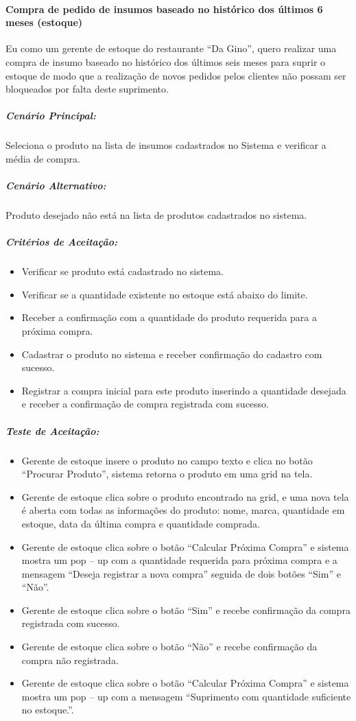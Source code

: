 \paragraph{Compra de pedido de insumos baseado no histórico dos últimos 6 meses (estoque)}

Eu como um gerente de estoque do restaurante “Da Gino”, quero realizar uma compra de insumo baseado no histórico dos últimos seis meses para suprir o estoque de modo que a realização de novos pedidos pelos clientes não possam ser bloqueados por falta deste suprimento.

\subparagraph{Cenário Principal:}

Seleciona o produto na lista de insumos cadastrados no Sistema e verificar a média de compra.

\subparagraph{Cenário Alternativo:}

Produto desejado não está na lista de produtos cadastrados no sistema.

\subparagraph{Critérios de Aceitação:}

\begin{itemize}
\item Verificar se produto está cadastrado no sistema.
\item Verificar se a quantidade existente no estoque está abaixo do limite.
\item Receber a confirmação com a quantidade do produto requerida para a próxima compra.
\item Cadastrar o produto no sistema e receber confirmação do cadastro com sucesso.
\item Registrar a compra inicial para este produto inserindo a quantidade desejada e receber a confirmação de compra registrada com sucesso.
\end{itemize}

\subparagraph{Teste de Aceitação:}

\begin{itemize}
\item Gerente de estoque insere o produto no campo texto e clica no botão “Procurar Produto”, sistema retorna o produto em uma grid na tela.
\item Gerente de estoque clica sobre o produto encontrado na grid, e uma nova tela é aberta com todas as informações do produto: nome, marca, quantidade em estoque, data da última compra e quantidade comprada.
\item Gerente de estoque clica sobre o botão “Calcular Próxima Compra” e sistema mostra um pop – up com a quantidade requerida para próxima compra e a mensagem “Deseja registrar a nova compra” seguida de dois botões “Sim” e “Não”.
\item Gerente de estoque clica sobre o botão “Sim” e recebe confirmação da compra registrada com sucesso.
\item Gerente de estoque clica sobre o botão “Não” e recebe confirmação da compra não registrada.
\item Gerente de estoque clica sobre o botão “Calcular Próxima Compra” e sistema mostra um pop – up com a mensagem “Suprimento com quantidade suficiente no estoque.”.
\end{itemize}

